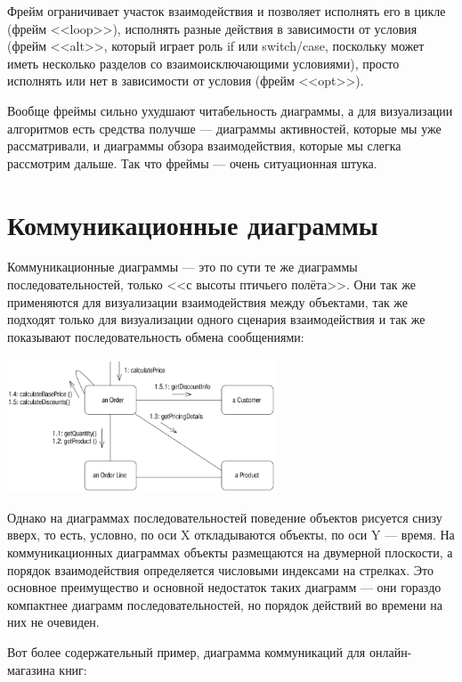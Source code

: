 \documentclass{../mcstext}
\begin{document}
Фрейм ограничивает участок взаимодействия и позволяет исполнять его в цикле (фрейм <<loop>>), исполнять разные действия в зависимости от условия (фрейм <<alt>>, который играет роль if или switch/case, поскольку может иметь несколько разделов со взаимоисключающими условиями), просто исполнять или нет в зависимости от условия (фрейм <<opt>>).

Вообще фреймы сильно ухудшают читабельность диаграммы, а для визуализации алгоритмов есть средства получше --- диаграммы активностей, которые мы уже рассматривали, и диаграммы обзора взаимодействия, которые мы слегка рассмотрим дальше. Так что фреймы --- очень ситуационная штука.

\section{Коммуникационные диаграммы}

Коммуникационные диаграммы --- это по сути те же диаграммы последовательностей, только <<с высоты птичьего полёта>>. Они так же применяются для визуализации взаимодействия между объектами, так же подходят только для визуализации одного сценария взаимодействия и так же показывают последовательность обмена сообщениями:

\begin{center}
    \includegraphics[width=0.6\textwidth]{communicationDiagram.png}
\end{center}

Однако на диаграммах последовательностей поведение объектов рисуется снизу вверх, то есть, условно, по оси X откладываются объекты, по оси Y --- время. На коммуникационных диаграммах объекты размещаются на двумерной плоскости, а порядок взаимодействия определяется числовыми индексами на стрелках. Это основное преимущество и основной недостаток таких диаграмм --- они гораздо компактнее диаграмм последовательностей, но порядок действий во времени на них не очевиден.

Вот более содержательный пример, диаграмма коммуникаций для онлайн-магазина книг:
\end{document}
